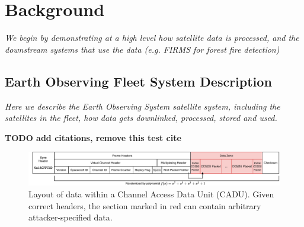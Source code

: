 \section{Background}

\textit{We begin by demonstrating at a high level how satellite data is processed, and the downstream systems that use the data (e.g. FIRMS for forest fire detection)}


\subsection{Earth Observing Fleet System Description}

\textit{Here we describe the Earth Observing System satellite system, including the satellites in the fleet, how data gets downlinked, processed, stored and used.}



\textbf{TODO add citations, remove this test cite}~\cite{moser2019digital}

\begin{figure}
    \centering
    \includegraphics[width=\textwidth]{diagrams/cadu_diagram.pdf}
    \caption{Layout of data within a Channel Access Data Unit (CADU). Given correct headers, the section marked in red can contain arbitrary attacker-specified data.}
    \label{fig:cadu_diagram}
\end{figure}




